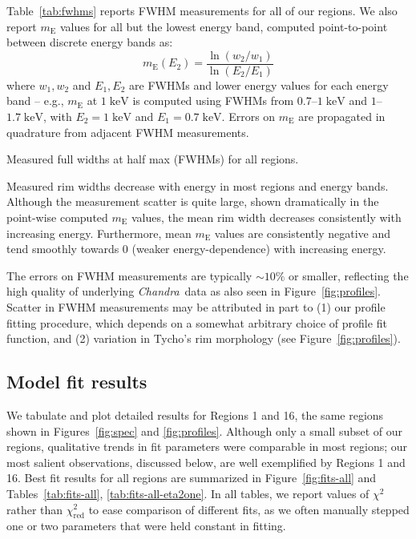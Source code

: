 \documentclass[iop, apj, numberedappendix]{emulateapj}
\newcommand*{\mt}{\mathrm}
\newcommand*{\unit}[1]{\;\mt{#1}}  %
\newcommand*{\abt}{\mathord{\sim}} %
\newcommand*{\Chandra}{\textit{Chandra}\ }
\newcommand*{\mE}{m_\mt{E}}
\begin{document}
Table~\ref{tab:fwhms} reports FWHM measurements for all of our regions.
We also report $\mE$ values for all but the lowest energy band, computed
point-to-point between discrete energy bands as:
\begin{equation}
    \mE(E_2) = \frac{\ln(w_2/w_1)}{\ln(E_2/E_1)}
\end{equation}
where $w_1, w_2$ and $E_1, E_2$ are FWHMs and lower energy values for each
energy band -- e.g., $\mE$ at $1 \unit{keV}$ is computed using FWHMs from
$0.7$--$1 \unit{keV}$ and $1$--$1.7 \unit{keV}$, with $E_2 = 1 \unit{keV}$ and
$E_1 = 0.7 \unit{keV}$.  Errors on $\mE$ are propagated in quadrature from
adjacent FWHM measurements.

\begin{table*}
    \iftoggle{manuscript}{
        \tiny
    }{
        \scriptsize
    }
    \centering
    \caption{Measured full widths at half max (FWHMs) for all regions.
             \label{tab:fwhms}}
    
\end{table*}

Measured rim widths decrease with energy in most regions and energy bands.
Although the measurement scatter is quite large, shown dramatically in the
point-wise computed $\mE$ values, the mean rim width decreases consistently
with increasing energy.  Furthermore, mean $\mE$ values are consistently
negative and tend smoothly towards $0$ (weaker energy-dependence) with
increasing energy.

The errors on FWHM measurements are typically $\abt 10\%$ or smaller,
reflecting the high quality of underlying \Chandra data as also seen in
Figure~\ref{fig:profiles}.  Scatter in FWHM measurements may be attributed in
part to (1) our profile fitting procedure, which depends on a somewhat
arbitrary choice of profile fit function, and (2) variation in Tycho's rim
morphology (see Figure~\ref{fig:profiles}).

\subsection{Model fit results}
\label{sec:fit-results}

We tabulate and plot detailed results for Regions 1 and 16, the same regions
shown in Figures~\ref{fig:spec} and \ref{fig:profiles}.  Although only a small
subset of our regions, qualitative trends in fit parameters were comparable in
most regions; our most salient observations, discussed below, are well
exemplified by Regions 1 and 16.  Best fit results for all regions are
summarized in Figure~\ref{fig:fits-all} and Tables~\ref{tab:fits-all},
\ref{tab:fits-all-eta2one}.  In all tables, we report values of $\chi^2$ rather
than $\chi^2_\mt{red}$ to ease comparison of different fits, as we often
manually stepped one or two parameters that were held constant in fitting.
\end{document}
